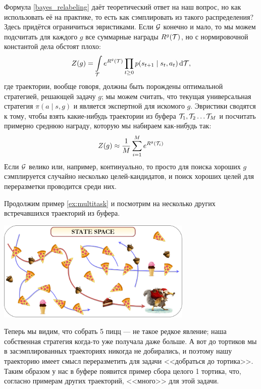 Формула \eqref{bayes_relabeling} даёт теоретический ответ на наш вопрос, но как использовать её на практике, то есть как сэмплировать из такого распределения? Здесь придётся ограничиться эвристиками. Если $\mathcal{G}$ конечно и мало, то мы можем подсчитать для каждого $g$ все суммарные награды $R^g(\mathcal{T})$, но с нормировочной константой дела обстоят плохо: 
$$Z(g) = \int\limits_{\mathcal{T}} e^{R^g(\mathcal{T})} \prod_{t \ge 0}p(s_{t+1} \mid s_t, a_t) \mathop{}\!\mathrm{d} \mathcal{T},$$
где траектории, вообще говоря, должны быть порождены оптимальной стратегией, решающей задачу $g$; мы можем считать, что текущая универсальная стратегия $\pi(a \mid s, g)$ и является экспертной для искомого $g$. Эвристики сводятся к тому, чтобы взять какие-нибудь траектории из буфера $\mathcal{T}_1, \mathcal{T}_2 \dots \mathcal{T}_M$ и посчитать примерно среднюю награду, которую мы набираем как-нибудь так:
$$Z(g) \approx \frac{1}{M} \sum_{i = 1}^M e^{R^g(\mathcal{T}_i)}$$
Если $\mathcal{G}$ велико или, например, континуально, то просто для поиска хороших $g$ сэмплируется случайно несколько целей-кандидатов, и поиск хороших целей для переразметки проводится среди них.

\begin{example}
Продолжим пример \ref{ex:multitask} и посмотрим на несколько других встречавшихся траекторий из буфера.
\begin{center}
    \includegraphics[width=0.7\textwidth]{Images/MultiTask3}
\end{center}
Теперь мы видим, что собрать 5 пицц --- не такое редкое явление; наша собственная стратегия когда-то уже получала даже больше. А вот до тортиков мы в засэмплированных траекториях никогда не добирались, и поэтому нашу траекторию имеет смысл переразметить для задачи <<добраться до тортика>>. Таким образом у нас в буфере появится пример сбора целого 1 тортика, что, согласно примерам других траекторий, <<много>> для этой задачи.
\end{example}